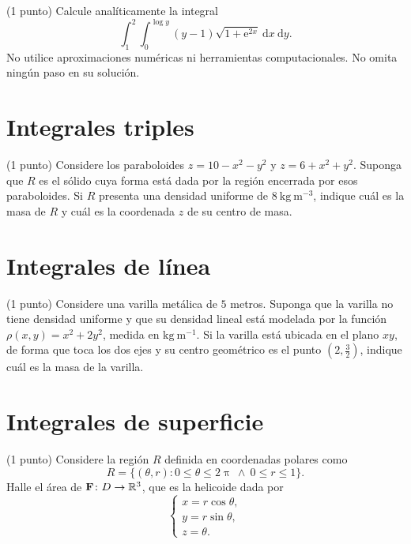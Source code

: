 \documentclass{fmbvecto}
\begin{document}
(1 punto) Calcule analíticamente la integral \[ \int_{1}^{2} \int_{0}^{\log y} (y-1) \sqrt{1 + \mathrm{e}^{2x}} \: \mathrm{d}x \: \mathrm{d}y. \] No utilice aproximaciones numéricas ni herramientas computacionales. No omita ningún paso en su solución.

\section{Integrales triples}

(1 punto) Considere los paraboloides \(z = 10 - x^2 - y^2\) y \(z = 6 + x^2 + y^2\). Suponga que \(R\) es el sólido cuya forma está dada por la región encerrada por esos paraboloides. Si \(R\) presenta una densidad uniforme de \(8 \: \text{kg} \: \text{m}^{-3}\), indique cuál es la masa de \(R\) y cuál es la coordenada \(z\) de su centro de masa.

\section{Integrales de línea}

(1 punto) Considere una varilla metálica de \(5\) metros. Suponga que la varilla no tiene densidad uniforme y que su densidad lineal está modelada por la función \(\rho(x, y) = x^2 + 2y^2\), medida en \(\text{kg} \: \text{m}^{-1}\). Si la varilla está ubicada en el plano \(xy\), de forma que toca los dos ejes y su centro geométrico es el punto \((2, \frac{3}{2})\), indique cuál es la masa de la varilla.

\section{Integrales de superficie}
    
(1 punto) Considere la región \(R\) definida en coordenadas polares como \[R = \{(\theta, r) \colon 0 \leq \theta \leq 2\uppi \ \land \ 0 \leq r \leq 1\}.\] Halle el área de \(\boldsymbol{{\mathbf{F}}}\colon D\to \mathbb{R}^3\), que es la helicoide dada por \[\begin{cases}
            x = r\cos\theta, \\
            y = r\sin\theta, \\
            z = \theta.
        \end{cases}\]
\end{document}
